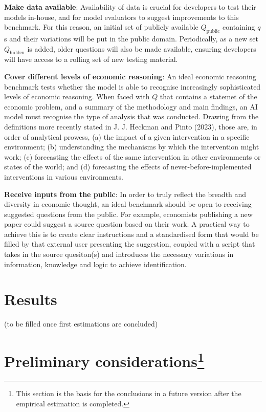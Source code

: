 \documentclass[
]{article}
\begin{document}
\textbf{Make data available}: Availability of data is crucial for
developers to test their models in-house, and for model evaluators to
suggest improvements to this benchmark. For this reason, an initial set
of publicly available \(Q_{\text{public}}\) containing \(q\)s and their
variations will be put in the public domain. Periodically, as a new set
\(Q_{\text{hidden}}\) is added, older questions will also be made
available, ensuring developers will have access to a rolling set of new
testing material.

\textbf{Cover different levels of economic reasoning}: An ideal economic
reasoning benchmark tests whether the model is able to recognise
increasingly sophisticated levels of economic reasoning. When faced with
\(Q\) that contains a statemet of the economic problem, and a summary of
the methodology and main findings, an AI model must recognise the type
of analysis that was conducted. Drawing from the definitions more
recently stated in J. J. Heckman and Pinto (2023), those are, in order
of analytical prowess, (a) the impact of a given intervention in a
specific environment; (b) understanding the mechanisms by which the
intervention might work; (c) forecasting the effects of the same
intervention in other environments or states of the world; and (d)
forecasting the effects of never-before-implemented interventions in
various environments.

\textbf{Receive inputs from the public}: In order to truly reflect the
breadth and diversity in economic thought, an ideal benchmark should be
open to receiving suggested questions from the public. For example,
economists publishing a new paper could suggest a source question based
on their work. A practical way to achieve this is to create clear
instructions and a standardised form that would be filled by that
external user presenting the suggestion, coupled with a script that
takes in the source quesiton(s) and introduces the necessary variations
in information, knowledge and logic to achieve identification.

\section{Results}\label{results}

(to be filled once first estimations are concluded)

\section[Preliminary considerations]{\texorpdfstring{Preliminary
considerations\footnote{This section is the basis for the conclusions in
  a future version after the empirical estimation is completed.}}{Preliminary considerations}}\label{preliminary-considerationsconcl}
\end{document}
